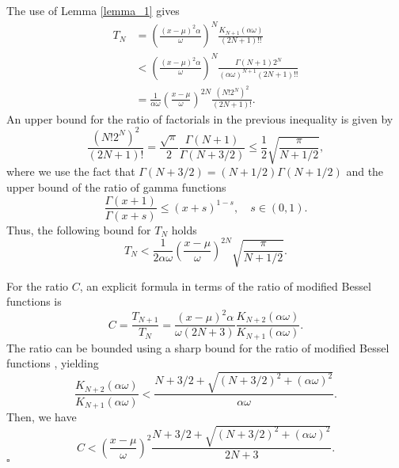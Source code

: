 \documentclass[10pt,a4paper,oneside]{article}
\newenvironment{proof}{\noindent{\bf Proof:}}{\hfill$\square$}
\numberwithin{equation}{section}
\begin{document}
\begin{proof}
The use of Lemma \ref{lemma_1} gives
\begin{align*}
T_N &= \left(\frac{(x-\mu)^2 \alpha}{\omega}\right)^N \frac{K_{N+1}(\alpha \omega)}{(2N +1)!!}\\
&<  \left(\frac{(x-\mu)^2 \alpha}{\omega}\right)^N \frac{\Gamma(N + 1)2^N}{(\alpha\omega)^{N + 1}(2N +1)!!}\\
&= \frac{1}{\alpha\omega}\left(\frac{x-\mu}{\omega}\right)^{2N} \frac{(N! 2^N)^2}{(2N + 1)!}.
\end{align*}
An upper bound for the ratio of factorials in the previous inequality is given by
\begin{equation*}
\frac{(N! 2^N)^2}{(2N + 1)!} = \frac{\sqrt{\pi}}{2}\frac{\Gamma(N+1)}{\Gamma(N + 3/2)} \le \frac{1}{2}\sqrt{\frac{\pi}{N + 1/2}},
\end{equation*}
where we use the fact that $\Gamma(N + 3/2) = (N + 1/2) \Gamma(N + 1/2)$ and the upper bound of the ratio of gamma functions \cite{Wendel1948}
\begin{equation}
\frac{\Gamma(x + 1)}{\Gamma(x+s)} \le (x + s)^{1-s}, \quad s \in (0, 1).
\end{equation}
Thus, the following bound for $T_N$ holds
\begin{equation}
T_N < \frac{1}{2\alpha\omega}\left(\frac{x-\mu}{\omega}\right)^{2N} \sqrt{\frac{\pi}{N + 1/2}}.
\end{equation}

For the ratio $C$, an explicit formula in terms of the ratio of modified Bessel functions is
\begin{equation}
C = \frac{T_{N+1}}{T_N} = \frac{(x-\mu)^2 \alpha}{\omega (2N + 3)} \frac{K_{N+2}(\alpha\omega)}{K_{N+1}(\alpha\omega)}.
\end{equation}
The ratio can be bounded using a sharp bound for the ratio of modified Bessel functions \cite{Segura2023}, yielding
\begin{equation}
\frac{K_{N+2}(\alpha\omega)}{K_{N+1}(\alpha\omega)} < \frac{N + 3/2 + \sqrt{(N + 3/2)^2 + (\alpha\omega)^2}}{\alpha \omega}.
\end{equation}
Then, we have
\begin{equation*}
C < \left(\frac{x-\mu}{\omega}\right)^2 \frac{N + 3/2 + \sqrt{(N + 3/2)^2 + (\alpha\omega)^2}}{2N + 3}.
\end{equation*}
\end{proof}
\end{document}
